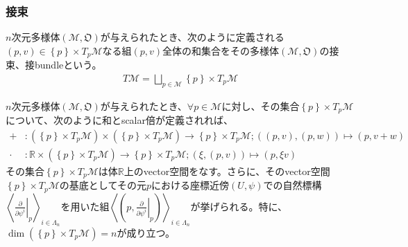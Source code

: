 \documentclass[dvipdfmx]{jsarticle}
\begin{document}
\subsubsection{接束}
\begin{dfn}
  $n$次元多様体$\left(\mathcal{M},\mathfrak{O}\right)$が与えられたとき、次のように定義される$\left(p,v\right)\in \left\{p\right\}\times T_p \mathcal{M}$なる組$\left(p,v\right)$全体の和集合をその多様体$\left(\mathcal{M},\mathfrak{O}\right)$の接束、接bundleという。
  \begin{align*}
    T \mathcal{M} =\bigsqcup_{p\in \mathcal{M}} \left\{p\right\} \times T_p \mathcal{M}
  \end{align*}
\end{dfn}
\begin{thm}\label{8.3.3.14}
  $n$次元多様体$\left(\mathcal{M},\mathfrak{O}\right)$が与えられたとき、$\forall p\in \mathcal{M}$に対し、その集合$\left\{ p\right\} \times T_p \mathcal{M}$について、次のように和とscalar倍が定義されれば、
  \begin{align*}
    +&:\left( \left\{ p\right\} \times T_p \mathcal{M} \right) \times \left( \left\{ p\right\} \times T_p \mathcal{M} \right) \rightarrow \left\{ p\right\} \times T_p \mathcal{M} ;\left(\left(p,v\right),\left(p,w\right) \right) \mapsto \left(p,v+w\right)\\
    \cdot &: \mathbb{R} \times \left( \left\{ p\right\} \times T_p \mathcal{M} \right) \rightarrow \left\{ p\right\} \times T_p \mathcal{M}; \left(\xi ,\left(p,v\right)\right) \mapsto \left(p,\xi v\right)
  \end{align*}
  その集合$\left\{ p\right\} \times T_p \mathcal{M}$は体$\mathbb{R}$上のvector空間をなす。さらに、そのvector空間$\left\{ p\right\} \times T_p \mathcal{M}$の基底としてその元$p$における座標近傍$\left(U,\psi\right)$での自然標構$\left\langle \left. \frac{\partial}{\partial \psi^i }\right|_p \right\rangle_{i\in \varLambda_n } $を用いた組$\left\langle \left(p,\left.\frac{\partial }{\partial \psi^i } \right|_p \right)\right\rangle_{i\in \varLambda_n }$が挙げられる。特に、$\dim \left( \left\{ p\right\} \times T_p \mathcal{M} \right) =n$が成り立つ。
\end{thm}
\end{document}
